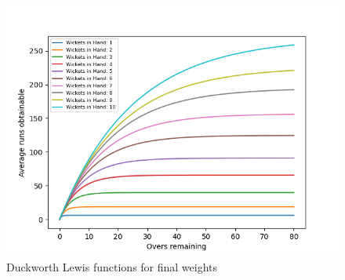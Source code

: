 \documentclass[12pt]{article}
\begin{document}
\vspace*{-1mm}
\begin{figure}[H]
    \centering
    \includegraphics[width=\textwidth]{plots/22205_Plot2.png}
    \caption{Duckworth Lewis functions for final weights}
\end{figure}
\end{document}
